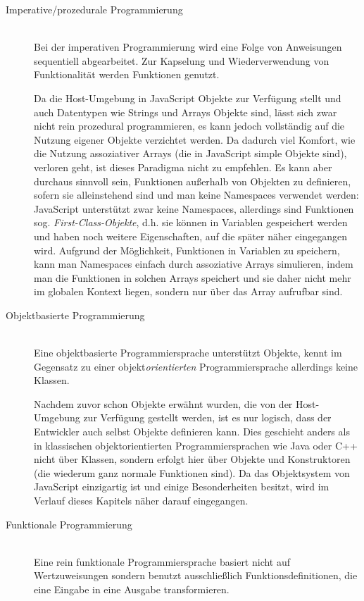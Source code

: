 \begin{description}
\item[Imperative/prozedurale Programmierung] \hfill \\
Bei der imperativen Programmierung wird eine Folge von Anweisungen sequentiell abgearbeitet. Zur
Kapselung und Wiederverwendung von Funktionalität werden Funktionen genutzt.
\citep[Kap. 1.3.1]{progsprachen}

Da die Host-Umgebung in JavaScript Objekte zur Verfügung stellt und auch Datentypen wie Strings und
Arrays Objekte sind, lässt sich zwar nicht rein prozedural programmieren, es kann jedoch vollständig
auf die Nutzung eigener Objekte verzichtet werden. Da dadurch viel Komfort, wie die Nutzung assoziativer
Arrays (die in JavaScript simple Objekte sind), verloren geht, ist dieses Paradigma nicht zu
empfehlen. Es kann aber durchaus sinnvoll sein, Funktionen außerhalb von Objekten zu definieren,
sofern sie alleinstehend sind und man keine Namespaces verwendet werden: JavaScript unterstützt zwar
keine Namespaces, allerdings sind Funktionen sog. \emph{First-Class-Objekte}, d.h. sie können in
Variablen gespeichert werden und haben noch weitere Eigenschaften, auf die später näher eingegangen
wird. Aufgrund der Möglichkeit, Funktionen in Variablen zu speichern, kann man Namespaces einfach
durch assoziative Arrays simulieren, indem man die Funktionen in solchen Arrays speichert und sie
daher nicht mehr im globalen Kontext liegen, sondern nur über das Array aufrufbar sind.

\item[Objektbasierte Programmierung] \hfill \\
Eine objektbasierte Programmiersprache unterstützt Objekte, kennt im Gegensatz zu einer
objekt\emph{orientierten} Programmiersprache allerdings keine Klassen.
\citep[Kap. 1.3.1]{progsprachen}

Nachdem zuvor schon Objekte erwähnt wurden, die von der Host-Umgebung zur Verfügung gestellt werden,
ist es nur logisch, dass der Entwickler auch selbst Objekte definieren kann. Dies geschieht anders
als in klassischen objektorientierten Programmiersprachen wie Java oder C++ nicht über Klassen,
sondern erfolgt hier über Objekte und Konstruktoren (die wiederum ganz normale Funktionen sind).  Da
das Objektsystem von JavaScript einzigartig ist und einige Besonderheiten besitzt, wird im Verlauf
dieses Kapitels näher darauf eingegangen.

\item[Funktionale Programmierung] \hfill \\
Eine rein funktionale Programmiersprache basiert nicht auf Wertzuweisungen sondern benutzt
ausschließlich Funktionsdefinitionen, die eine Eingabe in eine Ausgabe transformieren.
\citep[Kap. 1.3.1]{progsprachen}


\end{description}
